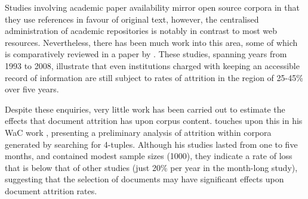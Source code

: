 

Studies involving academic paper availability mirror open source corpora in that they use references in favour of original text, however, the centralised administration of academic repositories is notably in contrast to most web resources.  Nevertheless, there has been much work into this area, some of which is comparatively reviewed in a paper by \cite{sanderson2011analyzing}.  These studies, spanning years from 1993 to 2008, illustrate that even institutions charged with keeping an accessible record of information are still subject to rates of attrition in the region of 25-45\% over five years.



Despite these enquiries, very little work has been carried out to estimate the effects that document attrition has upon corpus content.  %
\cite{sharoff2006creating} touches upon this in his WaC work , presenting a preliminary analysis of attrition within corpora generated by searching for 4-tuples.  Although his studies lasted from one to five months, and contained modest sample sizes (1000), they indicate a rate of loss that is below that of other studies (just 20\% per year in the month-long study), suggesting that the selection of documents may have significant effects upon document attrition rates.




